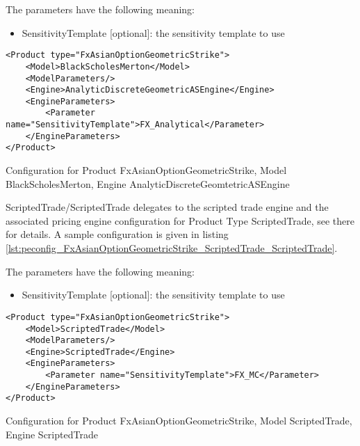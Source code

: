 The parameters have the following meaning:

\begin{itemize}
\item SensitivityTemplate [optional]: the sensitivity template to use 
\end{itemize}

\begin{longlisting}
\begin{verbatim}
<Product type="FxAsianOptionGeometricStrike">
    <Model>BlackScholesMerton</Model>
    <ModelParameters/>
    <Engine>AnalyticDiscreteGeometricASEngine</Engine>
    <EngineParameters>
        <Parameter name="SensitivityTemplate">FX_Analytical</Parameter>
    </EngineParameters>
</Product>
\end{verbatim}
\caption{Configuration for Product FxAsianOptionGeometricStrike, Model BlackScholesMerton, Engine AnalyticDiscreteGeomtetricASEngine}
\label{lst:peconfig_FxAsianOptionGeometricStrike_BlackScholesMerton_AnalyticDiscreteGeomtetricASEngine}
\end{longlisting}

ScriptedTrade/ScriptedTrade delegates to the scripted trade engine and the associated pricing engine configuration for
Product Type ScriptedTrade, see there for details. A sample configuration is given in listing
\ref{lst:peconfig_FxAsianOptionGeometricStrike_ScriptedTrade_ScriptedTrade}.

The parameters have the following meaning:

\begin{itemize}
\item SensitivityTemplate [optional]: the sensitivity template to use 
\end{itemize}

\begin{longlisting}
\begin{verbatim}
<Product type="FxAsianOptionGeometricStrike">
    <Model>ScriptedTrade</Model>
    <ModelParameters/>
    <Engine>ScriptedTrade</Engine>
    <EngineParameters>
        <Parameter name="SensitivityTemplate">FX_MC</Parameter>
    </EngineParameters>
</Product>
\end{verbatim}
\caption{Configuration for Product FxAsianOptionGeometricStrike, Model ScriptedTrade, Engine ScriptedTrade}
\label{lst:peconfig_FxAsianOptionGeometricStrike_ScriptedTrade_ScriptedTrade}
\end{longlisting}

